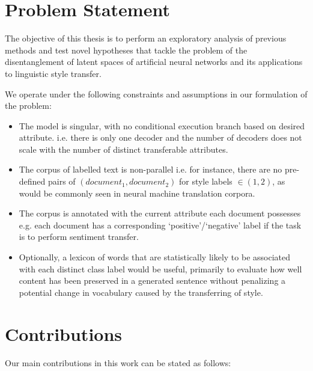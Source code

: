 \section{Problem Statement}

The objective of this thesis is to perform an exploratory analysis of previous methods and test novel hypotheses that tackle the problem of the disentanglement of latent spaces of artificial neural networks and its applications to linguistic style transfer.

We operate under the following constraints and assumptions in our formulation of the problem:

\begin{itemize}
	\item The model is singular, with no conditional execution branch based on desired attribute. i.e. there is only one decoder and the number of decoders does not scale with the number of distinct transferable attributes.
	\item The corpus of labelled text is non-parallel i.e. for instance, there are no pre-defined pairs of $(document_1, document_2)$ for style labels $\in (1, 2)$, as would be commonly seen in neural machine translation corpora.
	\item The corpus is annotated with the current attribute each document possesses e.g. each document has a corresponding `positive'/`negative' label if the task is to perform sentiment transfer.
	\item Optionally, a lexicon of words that are statistically likely to be associated with each distinct class label would be useful, primarily to evaluate how well content has been preserved in a generated sentence without penalizing a potential change in vocabulary caused by the transferring of style.
\end{itemize}


\section{Contributions}

Our main contributions in this work can be stated as follows:

